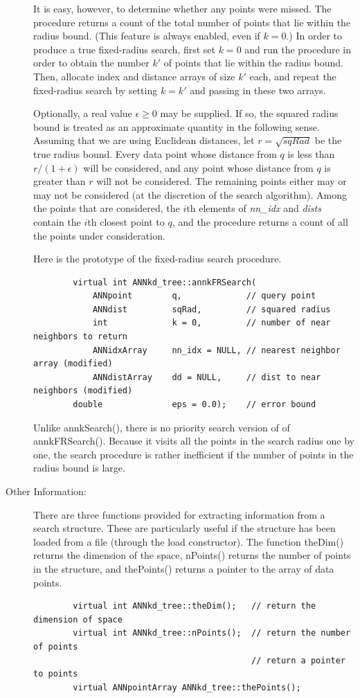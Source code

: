 \documentclass[11pt]{article}		%
\begin{document}
\begin{description}
	It is easy, however, to determine whether any points were missed.
	The procedure returns a count of the total number of points that lie
	within the radius bound.  (This feature is always enabled, even if
	$k = 0$.) In order to produce a true fixed-radius search, first set
	$k=0$ and run the procedure in order to obtain the number $k'$ of
	points that lie within the radius bound.  Then, allocate index and
	distance arrays of size $k'$ each, and repeat the fixed-radius
	search by setting $k=k'$ and passing in these two arrays.

	Optionally, a real value $\epsilon \ge 0$ may be supplied.  If so,
	the squared radius bound is treated as an approximate quantity in
	the following sense.  Assuming that we are using Euclidean
	distances, let $r = \sqrt{\textit{sqRad}}$ be the true radius bound.
	Every data point whose distance from $q$ is less than
	$r/(1+\epsilon)$ will be considered, and any point whose distance
	from $q$ is greater than $r$ will not be considered.  The remaining
	points either may or may not be considered (at the discretion of the
	search algorithm). Among the points that are considered, the $i$th
	elements of \textit{nn\_idx} and \textit{dists} contain the $i$th
	closest point to $q$, and the procedure returns a count of all the
	points under consideration.

	Here is the prototype of the fixed-radius search procedure.

	{\small \begin{verbatim}
	    virtual int ANNkd_tree::annkFRSearch(
	        ANNpoint        q,             // query point
	        ANNdist         sqRad,         // squared radius
	        int             k = 0,         // number of near neighbors to return
	        ANNidxArray     nn_idx = NULL, // nearest neighbor array (modified)
	        ANNdistArray    dd = NULL,     // dist to near neighbors (modified)
	    double              eps = 0.0);    // error bound
	\end{verbatim} }

	Unlike \textsf{annkSearch()}, there is no priority search version of
	of \textsf{annkFRSearch()}. Because it visits all the points in the
	search radius one by one, the search procedure is rather inefficient
	if the number of points in the radius bound is large.

\item[Other Information:] There are three functions provided for
	extracting information from a search structure.  These are
	particularly useful if the structure has been loaded from a file
	(through the load constructor).  The function \textsf{theDim()}
	returns the dimension of the space, \textsf{nPoints()} returns the
	number of points in the structure, and \textsf{thePoints()} returns
	a pointer to the array of data points.
	{\small \begin{verbatim}
	    virtual int ANNkd_tree::theDim();   // return the dimension of space
	    virtual int ANNkd_tree::nPoints();  // return the number of points
	                                        // return a pointer to points
	    virtual ANNpointArray ANNkd_tree::thePoints();
	\end{verbatim} }


\end{description}
\end{document}
